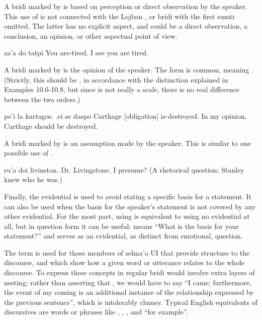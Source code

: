 A bridi marked by  is based on perception or direct
    observation by the speaker. This use of  is not
    connected with the Lojban , or bridi with the
    first sumti omitted. The latter has no explicit aspect, and
    could be a direct observation, a conclusion, an opinion, or
    other aspectual point of view.
\begin{example}
za'a do tatpi\n
{} You are-tired.\n
I see you are tired.
\end{example}

A bridi marked by  is the opinion of the speaker. The
    form  is common, meaning .
    (Strictly, this should be , in accordance with the
    distinction explained in Examples 10.6-10.8, but since 
    is not really a scale, there is no real difference between the
    two orders.)
\begin{example}
pe'i la kartagos. .ei se daspo\n
{} Carthage [obligation] is-destroyed.\n
In my opinion, Carthage should be destroyed.
\end{example}

A bridi marked by  is an assumption made by the
    speaker. This is similar to one possible use of .
\begin{example}
ru'a doi livinston.\n
Dr. Livingstone, I presume?\n
\T	(A rhetorical question: Stanley knew who he was.)
\end{example}

Finally, the evidential  is used to avoid stating a
    specific basis for a statement. It can also be used when the
    basis for the speaker's statement is not covered by any other
    evidential. For the most part, using  is equivalent to
    using no evidential at all, but in question form it can be
    useful:  means ``What is the basis for your
    statement?'' and serves as an evidential, as distinct from
    emotional, question.



The term  is used for those members of selma'o
    UI that provide structure to the discourse, and which show how
    a given word or utterance relates to the whole discourse. To
    express these concepts in regular bridi would involve extra
    layers of nesting: rather than asserting that ,
    we would have to say ``I came; furthermore, the event of my
    coming is an additional instance of the relationship expressed
    by the previous sentence'', which is intolerably clumsy.
    Typical English equivalents of discursives are words or phrases
    like , , , and ``for
    example''.

